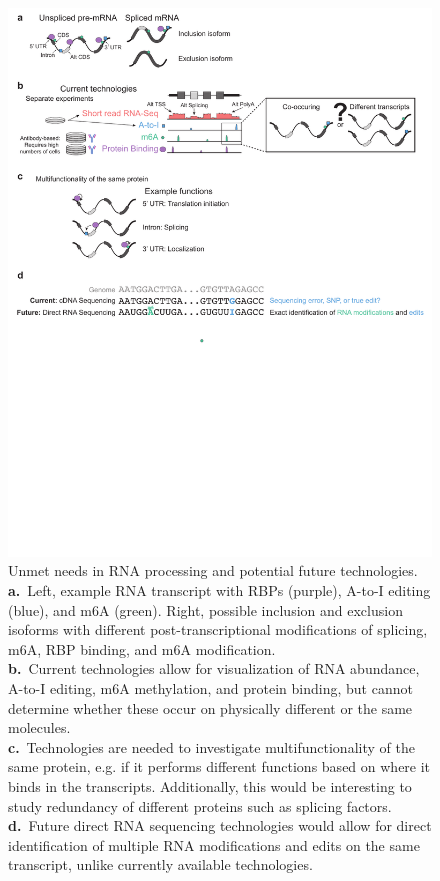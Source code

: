 \begin{figure}
  \centering
  \includegraphics[width=5.8in]{figures/singlecell_future_methods}
  \caption[Unmet needs in RNA processing and potential future technologies.]{Unmet needs in RNA processing and potential future technologies.\\
\textbf{a.}~Left, example RNA transcript with RBPs (purple), A-to-I editing (blue), and m6A (green). Right,  possible inclusion and exclusion isoforms with different post-transcriptional modifications of splicing, m6A, RBP binding, and m6A modification.\\
\textbf{b.}~Current technologies allow for visualization of RNA abundance, A-to-I editing, m6A methylation, and protein binding, but cannot determine whether these occur on physically different or the same molecules.\\
\textbf{c.}~Technologies are needed to investigate multifunctionality of the same protein, e.g. if it performs different functions based on where it binds in the transcripts. Additionally, this would be interesting to study redundancy of different proteins such as splicing factors.\\
\textbf{d.}~Future direct RNA sequencing technologies would allow for direct identification of multiple RNA modifications and edits on the same transcript, unlike currently available technologies.}
\label{fig:singlecell_future_methods}
\end{figure}


